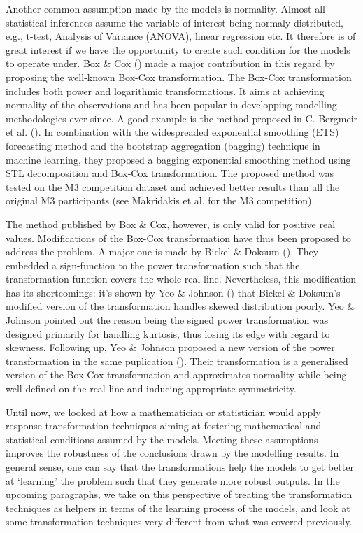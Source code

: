 Another common assumption made by the models is normality. Almost all statistical inferences assume the variable of interest being normaly distributed, e.g., t-test, Analysis of Variance (ANOVA), linear regression etc. It therefore is of great interest if we have the opportunity to create such condition for the models to operate under. Box \& Cox (\citeyear{box1964analysis}) made a major contribution in this regard by proposing the well-known Box-Cox transformation. The Box-Cox transformation includes both power and logarithmic transformations. It aims at achieving normality of the observations and has been popular in developping modelling methodologies ever since. A good example is the method proposed in C. Bergmeir et al. (\citeyear{bergmeir2016bagging}). In combination with the widespreaded exponential smoothing (ETS) forecasting method and the bootstrap aggregation (bagging) technique in machine learning, they proposed a bagging exponential smoothing method using STL decomposition and Box-Cox transformation. The proposed method was tested on the M3 competition dataset and achieved better results than all the original M3 participants (see Makridakis et al. \citeyear{makridakis2000m3} for the M3 competition).

The method published by Box \& Cox, however, is only valid for positive real values. Modifications of the Box-Cox transformation have thus been proposed to address the problem. A major one is made by Bickel \& Doksum (\citeyear{bickel1981analysis}). They embedded a sign-function to the power transformation such that the transformation function covers the whole real line. Nevertheless, this modification has its shortcomings: it's shown by Yeo \& Johnson (\citeyear{10.1093/biomet/87.4.954}) that Bickel \& Doksum's modified version of the transformation handles skewed distribution poorly. Yeo \& Johnson pointed out the reason being the signed power transformation was designed primarily for handling kurtosis, thus losing its edge with regard to skewness. Following up, Yeo \& Johnson proposed a new version of the power transformation in the same puplication (\citeyear{10.1093/biomet/87.4.954}). Their transformation is a generalised version of the Box-Cox transformation and approximates normality while being well-defined on the real line and inducing appropriate symmetricity.

Until now, we looked at how a mathematician or statistician would apply response transformation techniques aiming at fostering mathematical and statistical conditions assumed by the models. Meeting these assumptions improves the robustness of the conclusions drawn by the modelling results. In general sense, one can say that the transformations help the models to get better at `learning' the problem such that they generate more robust outputs. In the upcoming paragraphs, we take on this perspective of treating the transformation techniques as helpers in terms of the learning process of the models, and look at some transformation techniques very different from what was covered previously.

